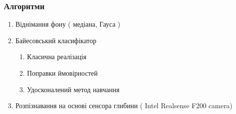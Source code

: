 \begin{frame}
	\manimate
	\frametitle{Алгоритми}
	\begin{enumerate}
		\item Віднімання фону ( медіана, Гауса )
		\item Байесовський класифікатор \\
		\begin{enumerate} 
			\item Класична реалізація
			\item Поправки ймовірностей
			\item Удосконалений метод навчання
		\end{enumerate}
		\item Розпізнавання на основі сенсора глибини ( Intel Realsense F200 camera)
	\end{enumerate}
	
\end{frame}